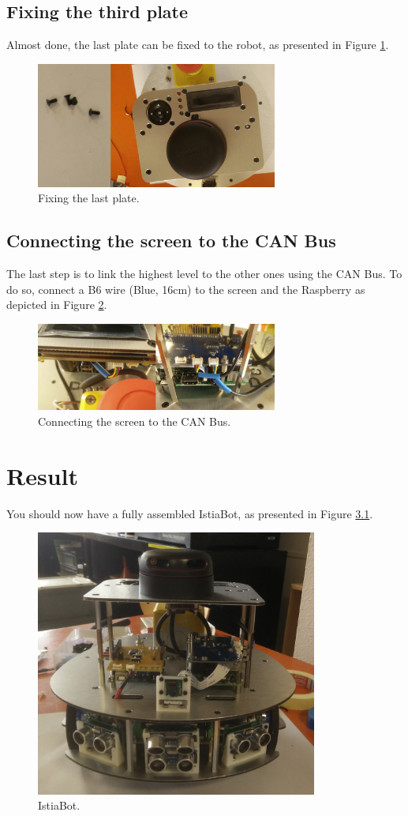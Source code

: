 \documentclass[10pt,a4paper]{report}   %
\begin{document}
\section{Fixing the third plate}

Almost done, the last plate can be fixed to the robot, as presented in Figure \ref{fig:85}.

\begin{figure}[H]
\center
\includegraphics[width=300px]{images/85.jpg}
\caption{Fixing the last plate.}
\label{fig:85}
\end{figure}

\section{Connecting the screen to the CAN Bus}

The last step is to link the highest level to the other ones using the CAN Bus. To do so, connect a B6 wire (Blue, 16cm) to the screen and the Raspberry as depicted in Figure \ref{fig:86}.


\begin{figure}[H]
\center
\includegraphics[width=300px]{images/86.jpg}
\caption{Connecting the screen to the CAN Bus.}
\label{fig:86}
\end{figure}


\chapter{Result}

You should now have a fully assembled IstiaBot, as presented in Figure \ref{fig:87}.

\begin{figure}[H]
\center
\includegraphics[width=350px]{images/87.jpg}
\caption{IstiaBot.}
\label{fig:87}
\end{figure}
\end{document}

